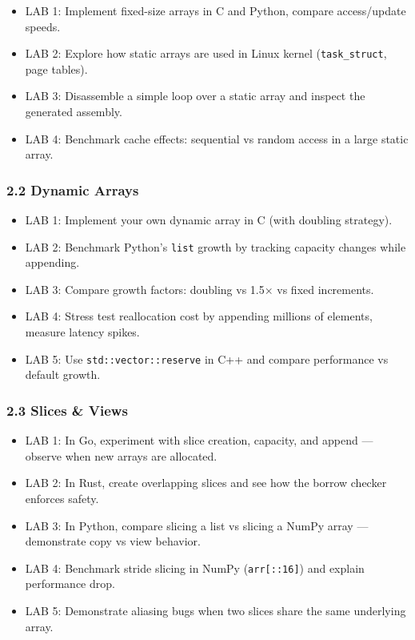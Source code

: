 \documentclass[
  letterpaper,
  DIV=11,
  numbers=noendperiod]{scrreprt}
\providecommand{\tightlist}{%
  \setlength{\itemsep}{0pt}\setlength{\parskip}{0pt}}
\begin{document}
\begin{itemize}
\tightlist
\item
  LAB 1: Implement fixed-size arrays in C and Python, compare
  access/update speeds.
\item
  LAB 2: Explore how static arrays are used in Linux kernel
  (\texttt{task\_struct}, page tables).
\item
  LAB 3: Disassemble a simple loop over a static array and inspect the
  generated assembly.
\item
  LAB 4: Benchmark cache effects: sequential vs random access in a large
  static array.
\end{itemize}

\subsubsection{2.2 Dynamic Arrays}\label{dynamic-arrays-2}

\begin{itemize}
\tightlist
\item
  LAB 1: Implement your own dynamic array in C (with doubling strategy).
\item
  LAB 2: Benchmark Python's \texttt{list} growth by tracking capacity
  changes while appending.
\item
  LAB 3: Compare growth factors: doubling vs 1.5× vs fixed increments.
\item
  LAB 4: Stress test reallocation cost by appending millions of
  elements, measure latency spikes.
\item
  LAB 5: Use \texttt{std::vector::reserve} in C++ and compare
  performance vs default growth.
\end{itemize}

\subsubsection{2.3 Slices \& Views}\label{slices-views-2}

\begin{itemize}
\tightlist
\item
  LAB 1: In Go, experiment with slice creation, capacity, and append ---
  observe when new arrays are allocated.
\item
  LAB 2: In Rust, create overlapping slices and see how the borrow
  checker enforces safety.
\item
  LAB 3: In Python, compare slicing a list vs slicing a NumPy array ---
  demonstrate copy vs view behavior.
\item
  LAB 4: Benchmark stride slicing in NumPy (\texttt{arr{[}::16{]}}) and
  explain performance drop.
\item
  LAB 5: Demonstrate aliasing bugs when two slices share the same
  underlying array.
\end{itemize}
\end{document}
